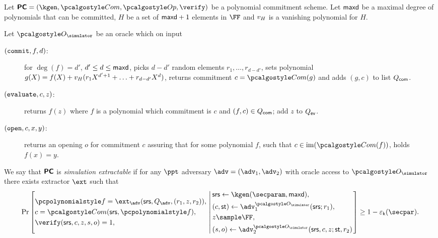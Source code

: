 \documentclass[runningheads,11pt]{llncs}
\begin{document}
\iffalse
\begin{definition}
  \label{def:sepcom}
  Let $\PCOM = (\kgen, \com, \open, \verify)$ be a polynomial commitment
  scheme. Let $\mathsf{maxd}$ be a maximal degree of polynomials that can be
  committed, $H$ be a set of $\mathsf{maxd} + 1$ elements in $\FF$ and
  $v_{H}$ is a vanishing polynomial for $H$.
  
  Let $\oracles$ be an oracle which on input
  \begin{description}
\item[$(\mathtt{commit}, f, d)$:] for $\deg(f) = d'$, $d' \leq d \leq \mathsf{maxd}$,
  picks $d - d'$ random elements $r_1, \ldots, r_{d - d'}$, sets 
  polynomial $g(X) = f(X) + v_{H}(r_1 X^{d' + 1} + \ldots + r_{d - d'} X^{d})$, returns
  commitment $c = \com(g)$ and adds $(g, c)$ to list $Q_{\mathsf{com}}$.
  \item[$(\mathtt{evaluate}, c, z)$:] returns $f(z)$ where $f$ is a polynomial
    which commitment is $c$ and $(f, c) \in Q_{\mathsf{com}}$; add $z$ to $Q_{\mathsf{ev}}$.
  \item[$(\mathtt{open}, c, x, y)$:] returns an opening $o$ for commitment $c$
    assuring that for some polynomial $f$, such that $c \in \image(\com(f))$,
    holds $f(x) = y$.
  \end{description}
  We say that $\bm{\mathsf{PC}}$ is \emph{simulation extractable} if for any $\ppt$
  adversary $\adv = (\adv_1, \adv_2)$ with oracle access to $\oracles$ there
  exists extractor $\ext$ such that
\[
  \Pr \left[
    \begin{aligned}
      & \p{f} = \ext_\adv(\srs, Q_{\adv}, (r_1, z, r_2)),\\
      & c = \com(\srs, \p{f}),\\
      & \verify(\srs, c, z, s, o) = 1,
    \end{aligned}
    \,\left|\,
      \vphantom{
        \begin{aligned}
          & \\
          & \\
          & \\
          &
        \end{aligned}
        }
    \begin{aligned}
      & \srs \gets \kgen(\secparam, \maxdeg),\\
      & (c, \state) \gets \adv_1^{\oracles}(\srs; r_1), \\
      & z \sample \FF, \\
      & (s, o) \gets \adv_2^{\oracles}(\srs, c, z; \state, r_2)
    \end{aligned}
  \right.\right]
  \geq 1 - \epsk(\secpar).
\]
\end{definition}
\end{document}
